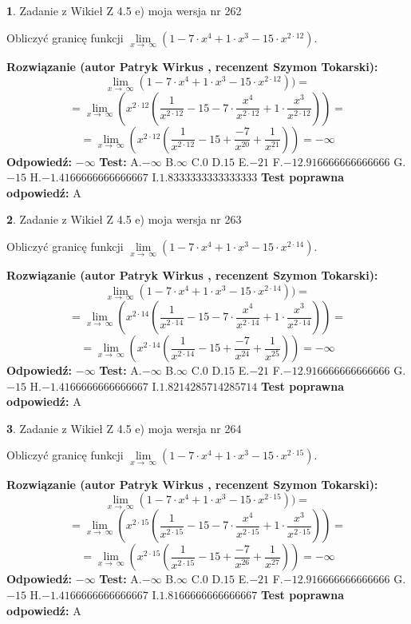 \documentclass[12pt, a4paper]{article}
\theoremstyle{definition} %
\newtheorem{zad}{}
\newcommand{\zadStart}[1]{\begin{zad}#1\newline}
\newcommand{\zadStop}{\end{zad}}
\newcommand{\rozwStart}[2]{\noindent \textbf{Rozwiązanie (autor #1 , recenzent #2): }\newline}
\newcommand{\rozwStop}{\newline}
\newcommand{\odpStart}{\noindent \textbf{Odpowiedź:}\newline}
\newcommand{\odpStop}{\newline}
\newcommand{\testStart}{\noindent \textbf{Test:}\newline}
\newcommand{\testStop}{\newline}
\newcommand{\kluczStart}{\noindent \textbf{Test poprawna odpowiedź:}\newline}
\newcommand{\kluczStop}{\newline}
\begin{document}
\zadStart{Zadanie z Wikieł Z 4.5 e) moja wersja nr 262}


Obliczyć granicę funkcji  $\lim\limits_{x\to\ \infty}(1 - 7 \cdot x^{4}+1 \cdot x^{3}- 15 \cdot x^{2\cdot12})$.
\zadStop
\rozwStart{Patryk Wirkus}{Szymon Tokarski}
$$\lim\limits_{x\to\ \infty}(1 - 7 \cdot x^{4}+1 \cdot x^{3}- 15 \cdot x^{2\cdot12}))=$$
$$=\lim\limits_{x\to\ \infty}(x^{2\cdot12}(\frac{1}{x^{2\cdot12}}-15 -7 \cdot \frac{x^{4}}{x^{2\cdot12}}+1 \cdot \frac{x^{3}}{x^{2\cdot12}}))=$$
$$=\lim\limits_{x\to\ \infty}(x^{2\cdot12}(\frac{1}{x^{2\cdot12}}-15 + \frac{-7}{x^{20}}+ \frac{1}{x^{21}}))=-\infty$$
\rozwStop
\odpStart
$-\infty$
\odpStop
\testStart
A.$-\infty$ B.$\infty$ C.$0$ D.$15$ E.$-21$
F.$-12.916666666666666$ G.$-15$
H.$-1.4166666666666667$
I.$1.8333333333333333$
\testStop
\kluczStart
A
\kluczStop



\zadStart{Zadanie z Wikieł Z 4.5 e) moja wersja nr 263}


Obliczyć granicę funkcji  $\lim\limits_{x\to\ \infty}(1 - 7 \cdot x^{4}+1 \cdot x^{3}- 15 \cdot x^{2\cdot14})$.
\zadStop
\rozwStart{Patryk Wirkus}{Szymon Tokarski}
$$\lim\limits_{x\to\ \infty}(1 - 7 \cdot x^{4}+1 \cdot x^{3}- 15 \cdot x^{2\cdot14}))=$$
$$=\lim\limits_{x\to\ \infty}(x^{2\cdot14}(\frac{1}{x^{2\cdot14}}-15 -7 \cdot \frac{x^{4}}{x^{2\cdot14}}+1 \cdot \frac{x^{3}}{x^{2\cdot14}}))=$$
$$=\lim\limits_{x\to\ \infty}(x^{2\cdot14}(\frac{1}{x^{2\cdot14}}-15 + \frac{-7}{x^{24}}+ \frac{1}{x^{25}}))=-\infty$$
\rozwStop
\odpStart
$-\infty$
\odpStop
\testStart
A.$-\infty$ B.$\infty$ C.$0$ D.$15$ E.$-21$
F.$-12.916666666666666$ G.$-15$
H.$-1.4166666666666667$
I.$1.8214285714285714$
\testStop
\kluczStart
A
\kluczStop



\zadStart{Zadanie z Wikieł Z 4.5 e) moja wersja nr 264}


Obliczyć granicę funkcji  $\lim\limits_{x\to\ \infty}(1 - 7 \cdot x^{4}+1 \cdot x^{3}- 15 \cdot x^{2\cdot15})$.
\zadStop
\rozwStart{Patryk Wirkus}{Szymon Tokarski}
$$\lim\limits_{x\to\ \infty}(1 - 7 \cdot x^{4}+1 \cdot x^{3}- 15 \cdot x^{2\cdot15}))=$$
$$=\lim\limits_{x\to\ \infty}(x^{2\cdot15}(\frac{1}{x^{2\cdot15}}-15 -7 \cdot \frac{x^{4}}{x^{2\cdot15}}+1 \cdot \frac{x^{3}}{x^{2\cdot15}}))=$$
$$=\lim\limits_{x\to\ \infty}(x^{2\cdot15}(\frac{1}{x^{2\cdot15}}-15 + \frac{-7}{x^{26}}+ \frac{1}{x^{27}}))=-\infty$$
\rozwStop
\odpStart
$-\infty$
\odpStop
\testStart
A.$-\infty$ B.$\infty$ C.$0$ D.$15$ E.$-21$
F.$-12.916666666666666$ G.$-15$
H.$-1.4166666666666667$
I.$1.8166666666666667$
\testStop
\kluczStart
A
\kluczStop
\end{document}
